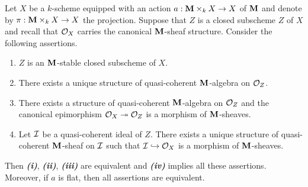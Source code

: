 \begin{proposition}\label{proposition:stable_closed_subschemes}
Let $X$ be a $k$-scheme equipped with an action $a:\mathbf{M}\times_kX\rightarrow X$ of $\mathbf{M}$ and denote by $\pi:\mathbf{M}\times_kX\rightarrow X$ the projection. Suppose that $Z$ is a closed subscheme $Z$ of $X$ and recall that ${\mathcal O}_X$ carries the canonical $\mathbf{M}$-sheaf structure. Consider the following assertions.
\begin{enumerate}[label= \emph{\textbf{(\roman*)}}, leftmargin=3.0em]
\item $Z$ is an $\mathbf{M}$-stable closed subscheme of $X$.
\item There exists a unique structure of quasi-coherent $\mathbf{M}$-algebra on ${\mathcal O}_Z$.
\item There exists a structure of quasi-coherent $\mathbf{M}$-algebra on ${\mathcal O}_Z$ and the canonical epimorphism ${\mathcal O}_X\twoheadrightarrow {\mathcal O}_Z$ is a morphism of $\mathbf{M}$-sheaves.
\item Let ${\mathcal I}$ be a quasi-coherent ideal of $Z$. There exists a unique structure of quasi-coherent $\mathbf{M}$-sheaf on ${\mathcal I}$ such that ${\mathcal I}\hookrightarrow {\mathcal O}_X$ is a morphism of $\mathbf{M}$-sheaves.
\end{enumerate}
Then \emph{\textbf{(i)}}, \emph{\textbf{(ii)}}, \emph{\textbf{(iii)}} are equivalent and \emph{\textbf{(iv)}} implies all these assertions. Moreover, if $a$ is flat, then all assertions are equivalent.
\end{proposition}
